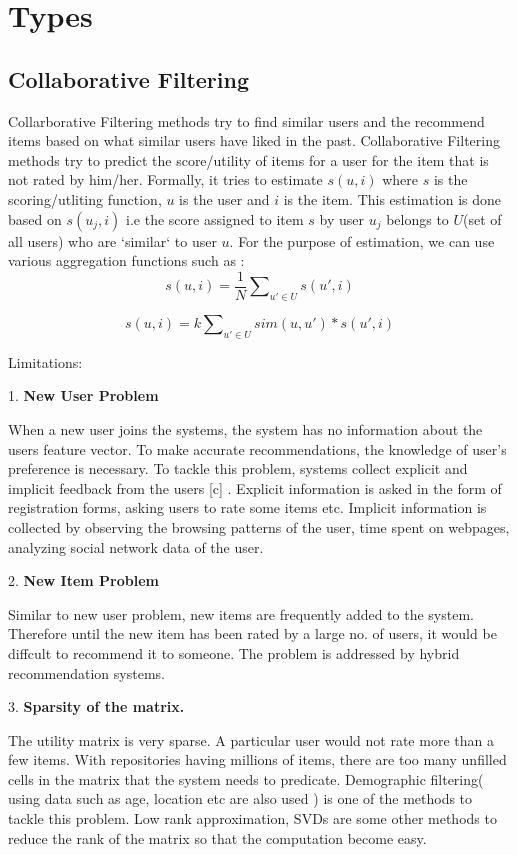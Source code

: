 \section{Types}
\subsection{Collaborative Filtering}
Collarborative Filtering methods try to find similar users and the recommend items based on what similar users have liked in the past. Collaborative Filtering methods try to predict the score/utility of items for a user for the item that is not rated by him/her. Formally, it tries to estimate $s(u,i)$ where $s$ is the scoring/utliting function, $u$ is the user and $i$ is the item. This estimation is done based on $s(u_j,i)$ i.e the score assigned to item $s$ by user $u_j$ belongs to $U$(set of all users) who are `similar` to user $u$. For the purpose of estimation, we can use various aggregation functions such as : 
\begin{equation}
s(u,i) = \frac{1}{N}\sum\nolimits_{u' \in U} s(u',i) 
\end{equation}

\begin{equation}
s(u,i) = k\sum\nolimits_{u' \in U} sim(u,u') * s(u',i) 
\end{equation}

Limitations:

1. {\bf New User Problem}

When a new user joins the systems, the system has no information about the users feature vector. To make accurate recommendations, the knowledge of user's preference is necessary. To tackle this problem, systems collect explicit and implicit feedback from the users [c] . Explicit information is asked in the form of registration forms, asking users to rate some items etc. Implicit information is collected by observing the browsing patterns of the user, time spent on webpages, analyzing social network data of the user.

2. {\bf New Item Problem}

Similar to new user problem, new items are frequently added to the system. Therefore until the new item has been rated by a large no. of users, it would be diffcult to recommend it to someone. The problem is addressed by hybrid recommendation systems.

3. {\bf Sparsity of the matrix.}

The utility matrix is very sparse. A particular user would not rate more than a few items. With repositories having millions of items, there are too many unfilled cells in the matrix that the system needs to predicate. Demographic filtering( using data such as age, location etc are also used ) is one of the methods to tackle this problem. Low rank approximation, SVDs are some other methods to reduce the rank of the matrix so that the computation become easy. 

